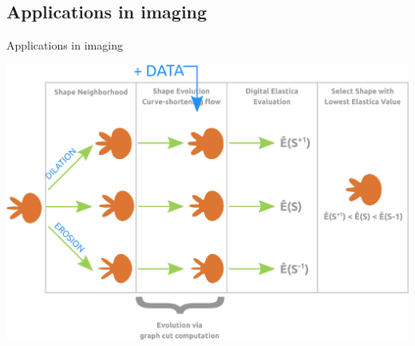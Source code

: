 \subsection*{Applications in imaging}

\begin{frame}
{Applications in imaging}

\includegraphics[scale=0.36]{figures/model-workflow/workflow-8.png}

\end{frame}

